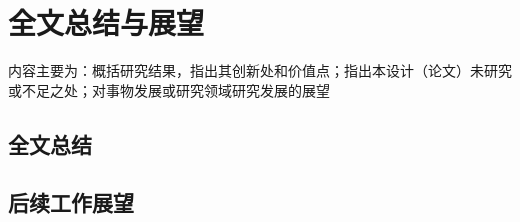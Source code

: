 
\chapter{全文总结与展望}\label{ch:6}
内容主要为：概括研究结果，指出其创新处和价值点；指出本设计（论文）未研究或不足之处；对事物发展或研究领域研究发展的展望
\section{全文总结}

\section{后续工作展望}